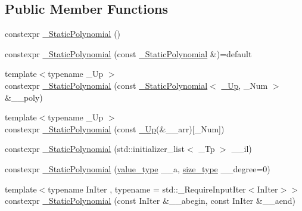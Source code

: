 \subsection*{Public Member Functions}
\begin{DoxyCompactItemize}
\item 
constexpr \hyperlink{class____gnu__cxx_1_1__StaticPolynomial_abbea33a8746fecebbf176da4e8e6c92d}{\+\_\+\+Static\+Polynomial} ()
\item 
constexpr \hyperlink{class____gnu__cxx_1_1__StaticPolynomial_ac78f6e97c292f3b391eac620afdbbab5}{\+\_\+\+Static\+Polynomial} (const \hyperlink{class____gnu__cxx_1_1__StaticPolynomial}{\+\_\+\+Static\+Polynomial} \&)=default
\item 
{\footnotesize template$<$typename \+\_\+\+Up $>$ }\\constexpr \hyperlink{class____gnu__cxx_1_1__StaticPolynomial_a1a605cf13d0f2c5c544ef44f785ef544}{\+\_\+\+Static\+Polynomial} (const \hyperlink{class____gnu__cxx_1_1__StaticPolynomial}{\+\_\+\+Static\+Polynomial}$<$ \hyperlink{namespace____gnu__cxx_ab693ea357b6429b331e0bf09f9442385}{\+\_\+\+Up}, \+\_\+\+Num $>$ \&\+\_\+\+\_\+poly)
\item 
{\footnotesize template$<$typename \+\_\+\+Up $>$ }\\constexpr \hyperlink{class____gnu__cxx_1_1__StaticPolynomial_a642809592b993037c2a373986342eaf7}{\+\_\+\+Static\+Polynomial} (const \hyperlink{namespace____gnu__cxx_ab693ea357b6429b331e0bf09f9442385}{\+\_\+\+Up}(\&\+\_\+\+\_\+arr)\mbox{[}\+\_\+\+Num\mbox{]})
\item 
constexpr \hyperlink{class____gnu__cxx_1_1__StaticPolynomial_a0d3bd778583b9df03f335d23881aa051}{\+\_\+\+Static\+Polynomial} (std\+::initializer\+\_\+list$<$ \+\_\+\+Tp $>$ \+\_\+\+\_\+il)
\item 
constexpr \hyperlink{class____gnu__cxx_1_1__StaticPolynomial_a3932d8d84fb3dbcb800bdf12a001b1c6}{\+\_\+\+Static\+Polynomial} (\hyperlink{class____gnu__cxx_1_1__StaticPolynomial_af23110f5a002cd6caa3542df7cf35284}{value\+\_\+type} \+\_\+\+\_\+a, \hyperlink{class____gnu__cxx_1_1__StaticPolynomial_a3384ce6a956ad398fc995e6ee53b2b18}{size\+\_\+type} \+\_\+\+\_\+degree=0)
\item 
{\footnotesize template$<$typename In\+Iter , typename  = std\+::\+\_\+\+Require\+Input\+Iter$<$\+In\+Iter$>$$>$ }\\constexpr \hyperlink{class____gnu__cxx_1_1__StaticPolynomial_aaa1495bb871e3f2dbcfa7c88553f9ee1}{\+\_\+\+Static\+Polynomial} (const In\+Iter \&\+\_\+\+\_\+abegin, const In\+Iter \&\+\_\+\+\_\+aend)

\end{DoxyCompactItemize}
